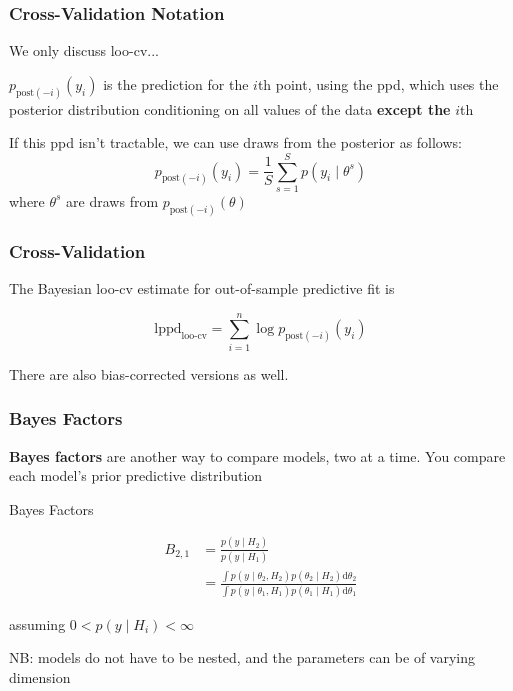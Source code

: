 \documentclass{beamer}
\begin{document}
\begin{frame}
\frametitle{Cross-Validation Notation}

We only discuss loo-cv...
\newline

$p_{\text{post}(-i)}(y_i)$ is the prediction for the $i$th point, using the ppd, which uses the posterior distribution conditioning on all values of the data {\bf except the} $i$th
\newline
\pause

If this ppd isn't tractable, we can use draws from the posterior as follows:
\[
p_{\text{post}(-i)}(y_i) = \frac{1}{S}\sum_{s=1}^S p(y_i \mid \theta^s)
\]
where $\theta^s$ are draws from $p_{\text{post}(-i)}(\theta)$
\newline

\end{frame}

\begin{frame}
\frametitle{Cross-Validation}


The Bayesian loo-cv estimate for out-of-sample predictive fit is 

\[
\text{lppd}_{\text{loo-cv}} = \sum_{i=1}^n \log p_{\text{post}(-i)}(y_i)
\]

There are also bias-corrected versions as well.

\end{frame}

\begin{frame}
\frametitle{Bayes Factors}

{\bf Bayes factors} are another way to compare models, two at a time. You compare each model's prior predictive distribution
\begin{block}{Bayes Factors}

\begin{align*}
B_{2,1} &= \frac{p(y \mid H_2)}{p(y \mid H_1)}\\
&= \frac{\int p(y \mid \theta_2, H_2)p(\theta_2 \mid H_2) \text{d}\theta_2}{\int p(y \mid \theta_1, H_1)p(\theta_1 \mid H_1) \text{d}\theta_1}
\end{align*}

assuming $0 < p(y \mid H_i) < \infty$
\end{block}

NB: models do not have to be nested, and the parameters can be of varying dimension

\end{frame}
\end{document}
